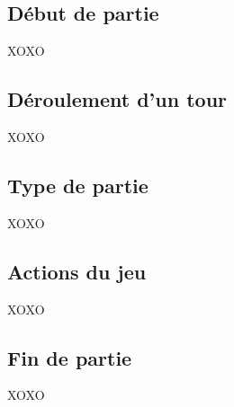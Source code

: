 \subsection{Début de partie}

XOXO

\subsection{Déroulement d'un tour}

XOXO

\subsection{Type de partie}

XOXO

\subsection{Actions du jeu}

XOXO

\subsection{Fin de partie}

XOXO